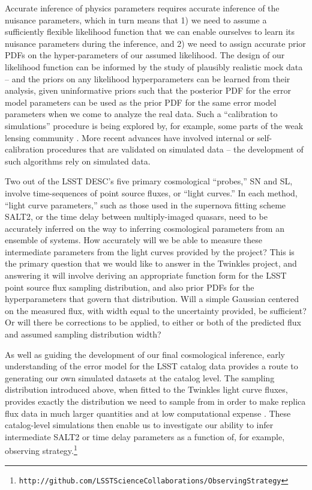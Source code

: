 \documentclass[\docopts]{\docclass}
\begin{document}
Accurate inference of physics parameters requires accurate inference of the nuisance parameters, which in turn means that 1) we need to assume a sufficiently flexible likelihood function that we can enable ourselves to learn its nuisance parameters during the inference, and 2) we need to assign accurate prior PDFs on the  hyper-parameters of our assumed likelihood.
The design of our likelihood function can be informed by the study of plausibly realistic mock data -- and the priors on any likelihood hyperparameters can be learned from their analysis, given uninformative priors such that the posterior PDF for the error model parameters can be used as the prior PDF for the same error model parameters when we come to analyze the real data.
Such a ``calibration to simulations'' procedure is being explored by, for example, some parts of the weak lensing community \citep[see e.g. the GREAT3 analysis][]{GREAT3}.
More recent advances have involved internal or self-calibration procedures \citep[e.g. ``metacal'', see][]{GREAT3} that are validated on simulated data -- the development of such algorithms rely on simulated data.

Two out of the LSST DESC's five primary cosmological ``probes,'' SN and SL, involve time-sequences of point source fluxes, or ``light curves.''
In each method, ``light curve parameters,'' such as those used in the supernova fitting scheme SALT2, or the time delay between multiply-imaged quasars, need to be accurately inferred on the way to inferring cosmological parameters from an ensemble of systems.
How accurately will we be able to measure these intermediate parameters from the light curves provided by the project?
This is the primary question that we would like to answer in the Twinkles project, and answering it will involve deriving an appropriate function form for the LSST point source flux sampling distribution, and also prior PDFs for the hyperparameters that govern that distribution. Will a simple Gaussian centered on  the measured flux, with width equal to the uncertainty provided, be sufficient?
Or will there be corrections to be applied, to either or both of the predicted flux and assumed sampling distribution width?

As well as guiding the development of our final cosmological inference, early understanding of the error model for the LSST catalog data provides a route to generating our own simulated datasets at the catalog level.
The sampling distribution introduced above, when fitted to the Twinkles light curve fluxes, provides exactly the distribution we need to sample from in order to make replica flux data in much larger quantities and at low computational expense \citep[see e.g.][]{TDC1}.
These catalog-level simulations then enable us to investigate our ability to infer intermediate SALT2 or time delay parameters as a function of, for example, observing strategy.\footnote{\texttt{http://github.com/LSSTScienceCollaborations/ObservingStrategy}}
\end{document}
